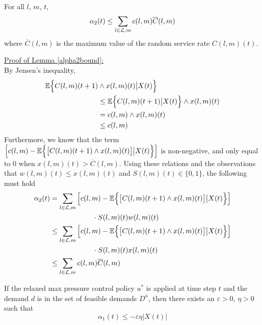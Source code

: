 
\begin{Lem} \label{alpha2bound}
For all $l$, $m$, $t$, 
\begin{equation} 
\alpha_2 (t) \leq \sum_{l \in \mathcal{L},m} c(l,m)\overline{C} (l,m)
\end{equation}
where $\overline{C} (l,m)$ is the maximum value of the random service rate $C(l,m)(t)$. 
\end{Lem}
\underline{Proof of Lemma \ref{alpha2bound}:} \\
By Jensen's inequality, 
\begin{align*}
\mathbb{E}\Big\{ C(l,m)(t+1) & \wedge x(l,m)(t) \big| X(t) \Big\} \\
& \leq \mathbb{E}\Big\{ C(l,m)(t+1) \big| X(t) \Big\}  \wedge x(l,m)(t) \\
&= c(l,m)\wedge x(l,m)(t) \\ 
&\leq c(l,m)
\end{align*}
 Furthermore, we know that the term 
$ \left[ c(l,m)- \mathbb{E}\Big\{  \big[C(l,m)(t+1)\wedge x(l,m)(t)\big] \big| X(t)  \Big\}  \right] $
is non-negative, and only equal to $0$ when $x(l,m)(t)>\overline C (l,m)$. 
Using these relations and the observations that $w(l,m)(t) \leq x(l,m)(t)$ and $S(l,m)(t)\in \{0,1\}$, the following must hold 
\begin{align*}
\alpha_2 (t) & = \sum_{l \in \mathcal{L},m} \left[ c(l,m)- \mathbb{E}\Big\{  \big[C(l,m)(t+1)\wedge x(l,m)(t)\big] \big| X(t)  \Big\}  \right] \\ &\qquad \qquad \qquad \cdot S(l,m)(t)w(l,m)(t) \\
& \leq \sum_{l \in \mathcal{L},m} \left[ c(l,m)- \mathbb{E}\Big\{  \big[C(l,m)(t+1)\wedge x(l,m)(t)\big] \big| X(t)  \Big\}  \right] \\ &\qquad \qquad \qquad \cdot S(l,m)(t)x(l,m)(t)   \\
& \leq \sum_{l \in \mathcal{L},m} c(l,m) \overline{C}(l,m)
 \end{align*}



 \begin{Lem} \label{alpha1bound}
If the relaxed max pressure control policy $u^*$ is applied at time step $t$ and the demand $d$ is in the set of feasible demands $D^\kappa$, then there exists an $\varepsilon>0$, $\eta>0$ such that 
\begin{equation} 
\alpha_1(t)  \leq -\varepsilon \eta \big| X(t)\big| 
\end{equation}
\end{Lem}









